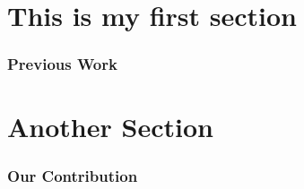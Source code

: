

\Beamertrue 







\begin{frame}
    \titlepage
\end{frame}

\section{This is my first section}
\begin{frame}
	\frametitle{Previous Work}
\end{frame}

\section{Another Section}
\begin{frame}
	\frametitle{Our Contribution}
\end{frame}

